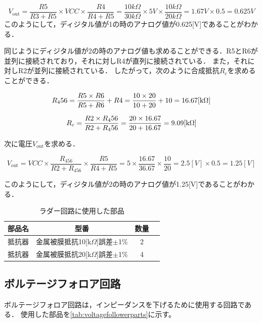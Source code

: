 \documentclass[a4paper,11pt,dvipdfmx]{jsarticle}
\begin{document}
\begin{equation}
  V_{\text{out}} = \frac{R5}{R3 + R5} \times VCC \times \frac{R4}{R4 + R5} =\frac{10kΩ}{30kΩ} \times 5V \times \frac{10kΩ}{20kΩ} = 1.67V \times 0.5 = 0.625V
  \label{eq:vout}
\end{equation}
このようにして，ディジタル値が1の時のアナログ値が0.625[V]であることがわかる．

同じようにディジタル値が2の時のアナログ値も求めることができる．R5とR6が並列に接続されており，それに対しR4が直列に接続されている．
また，それに対しR2が並列に接続されている．
したがって，次のように合成抵抗$R_c$を求めることができる．

\begin{equation}
  R_456 = \frac{R5 \times R6}{R5 + R6} + R4 = \frac{10 \times 20}{10 + 20} + 10 = 16.67[\rm{k\Omega}]
\end{equation}

\begin{equation}
  R_c = \frac{R2 \times R_456}{R2 + R_456} = \frac{20 \times 16.67}{20 + 16.67} = 9.09[\rm{k\Omega}]
\end{equation}

次に電圧$V_{\text{out}}$を求める．

\begin{equation}
  V_{\text{out}} = VCC \times \frac{R_456}{R2 + R_456} \times \frac{R5}{R4 + R5} = 5 \times \frac{16.67}{36.67} \times \frac{10}{20} = 2.5[V] \times 0.5 = 1.25[V]
\end{equation}

このようにして，ディジタル値が2の時のアナログ値が1.25[V]であることがわかる．

\begin{table}[H]
  \centering
  \caption{ラダー回路に使用した部品}
  \begin{tabular}{|c|c|c|c|}
    \hline
    部品名 & 型番 & 数量  \\
    \hline
    抵抗器 & 金属被膜抵抗10[k$\Omega$]誤差$\pm$1\% & 2  \\
    抵抗器 & 金属被膜抵抗20[k$\Omega$]誤差$\pm$1\% & 4  \\
    \hline
  \end{tabular}
  \label{tab:ladderparts}
\end{table}

\subsection{ボルテージフォロア回路}
ボルテージフォロア回路は，インピーダンスを下げるために使用する回路である．
使用した部品を\ref{tab:voltagefollowerparts}に示す。
\end{document}
